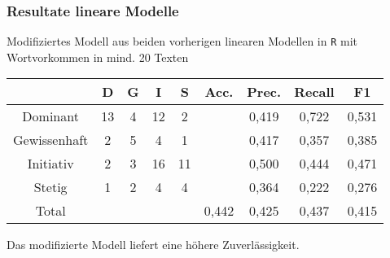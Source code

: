 \begin{frame}
 \frametitle{Resultate lineare Modelle}
Modifiziertes Modell aus beiden vorherigen linearen Modellen in \texttt{R} mit Wortvorkommen in mind. 20 Texten\\
\vspace{12pt}
\begin{tabular}{|c|c|c|c|c|c|c|c|c|}
\hline
				& D 	& G	& I & S	& Acc.	& Prec. & Recall	& F1\\
\hline
Dominant 		& 13	& 4 & 12& 2 &      	& 0,419 & 0,722 	& 0,531\\
Gewissenhaft 	& 2 	& 5 & 4 & 1 & 		& 0,417 & 0,357 	& 0,385\\
Initiativ 		& 2 	& 3	& 16& 11& 		& 0,500	& 0,444 	& 0,471\\
Stetig 			& 1 	& 2 & 4	& 4 & 		& 0,364	& 0,222 	& 0,276\\
\hline
Total 			& 		& 	& 	& 	& 0,442	& 0,425 & 0,437	  	& 0,415\\
\hline
\end{tabular}
 \vspace{12pt}
 
Das modifizierte Modell liefert eine höhere Zuverlässigkeit.
\end{frame}
